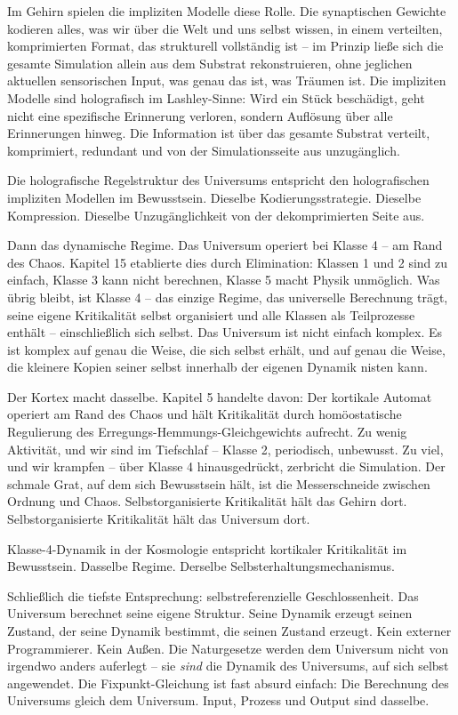 \documentclass[11pt, twoside, openright]{book}
\begin{document}
Im Gehirn spielen die impliziten Modelle diese Rolle. Die synaptischen Gewichte kodieren alles, was wir über die Welt und uns selbst wissen, in einem verteilten, komprimierten Format, das strukturell vollständig ist -- im Prinzip ließe sich die gesamte Simulation allein aus dem Substrat rekonstruieren, ohne jeglichen aktuellen sensorischen Input, was genau das ist, was Träumen ist. Die impliziten Modelle sind holografisch im Lashley-Sinne: Wird ein Stück beschädigt, geht nicht eine spezifische Erinnerung verloren, sondern Auflösung über alle Erinnerungen hinweg. Die Information ist über das gesamte Substrat verteilt, komprimiert, redundant und von der Simulationsseite aus unzugänglich.

Die holografische Regelstruktur des Universums entspricht den holografischen impliziten Modellen im Bewusstsein. Dieselbe Kodierungsstrategie. Dieselbe Kompression. Dieselbe Unzugänglichkeit von der dekomprimierten Seite aus.

Dann das dynamische Regime. Das Universum operiert bei Klasse 4 -- am Rand des Chaos. Kapitel 15 etablierte dies durch Elimination: Klassen 1 und 2 sind zu einfach, Klasse 3 kann nicht berechnen, Klasse 5 macht Physik unmöglich. Was übrig bleibt, ist Klasse 4 -- das einzige Regime, das universelle Berechnung trägt, seine eigene Kritikalität selbst organisiert und alle Klassen als Teilprozesse enthält -- einschließlich sich selbst. Das Universum ist nicht einfach komplex. Es ist komplex auf genau die Weise, die sich selbst erhält, und auf genau die Weise, die kleinere Kopien seiner selbst innerhalb der eigenen Dynamik nisten kann.

Der Kortex macht dasselbe. Kapitel 5 handelte davon: Der kortikale Automat operiert am Rand des Chaos und hält Kritikalität durch homöostatische Regulierung des Erregungs-Hemmungs-Gleichgewichts aufrecht. Zu wenig Aktivität, und wir sind im Tiefschlaf -- Klasse 2, periodisch, unbewusst. Zu viel, und wir krampfen -- über Klasse 4 hinausgedrückt, zerbricht die Simulation. Der schmale Grat, auf dem sich Bewusstsein hält, ist die Messerschneide zwischen Ordnung und Chaos. Selbstorganisierte Kritikalität hält das Gehirn dort. Selbstorganisierte Kritikalität hält das Universum dort.

Klasse-4-Dynamik in der Kosmologie entspricht kortikaler Kritikalität im Bewusstsein. Dasselbe Regime. Derselbe Selbsterhaltungsmechanismus.

Schließlich die tiefste Entsprechung: selbstreferenzielle Geschlossenheit. Das Universum berechnet seine eigene Struktur. Seine Dynamik erzeugt seinen Zustand, der seine Dynamik bestimmt, die seinen Zustand erzeugt. Kein externer Programmierer. Kein Außen. Die Naturgesetze werden dem Universum nicht von irgendwo anders auferlegt -- sie \textit{sind} die Dynamik des Universums, auf sich selbst angewendet. Die Fixpunkt-Gleichung ist fast absurd einfach: Die Berechnung des Universums gleich dem Universum. Input, Prozess und Output sind dasselbe.
\end{document}
